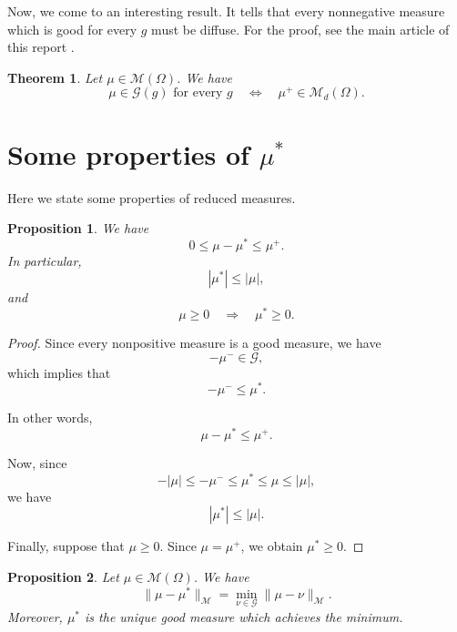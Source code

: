 \documentclass[a4paper, 11pt]{report}
\newtheorem{thm}{Theorem}[chapter]
\newtheorem{prn}{Proposition}[chapter]
\theoremstyle{definition}\newtheorem*{rmk}{Remark}
\begin{document}
Now, we come to an interesting result. It tells that every nonnegative measure which is good for every $g$ must be diffuse. For the proof, see the main article of this report \cite[Section 6]{BMP}.

\begin{thm}
Let $\mu \in \mathcal{M}(\Omega)$. We have
\[
\mu \in \mathcal{G}(g) \text{ for every } g \quad \Leftrightarrow \quad \mu^+ \in \mathcal{M}_d(\Omega).
\]
\end{thm}

\section{\texorpdfstring{Some properties of $\mu^*$}{Some properties of mu*}}
\mbox{}

Here we state some properties of reduced measures.

\begin{prn}
We have
\[
0 \le \mu - \mu ^* \le \mu^+.
\]
In particular,
\begin{equation}\label{016}
|\mu ^*| \le |\mu|,
\end{equation}
and
\[
\mu \ge 0 \quad \Rightarrow \quad \mu ^* \ge 0.
\]
\end{prn}

\begin{proof}
\mbox{}

Since every nonpositive measure is a good measure, we have
\[
-\mu^- \in\mathcal{G},
\]
which implies that
\[
-\mu^- \leq \mu^*.
\]

In other words,
\[
\mu - \mu^* \leq \mu^+.
\]

Now, since
\[
-|\mu| \leq -\mu^- \leq \mu^* \leq \mu \leq |\mu|,
\]
we have
\[
|\mu^*|\leq |\mu|.
\]

Finally, suppose that $\mu \geq 0$. Since $\mu = \mu^+$, we obtain $\mu^* \ge 0$.
\end{proof}

\begin{prn}
Let $\mu \in \mathcal{M}(\Omega)$. We have
\begin{equation}\label{prn50}
\| \mu - \mu^*\|_{\mathcal{M}} = \min_{\nu \in \mathcal{G}} \| \mu - \nu \|_{\mathcal{M}}.
\end{equation}
Moreover, $\mu^*$ is the unique good measure which achieves the minimum.
\end{prn}
\end{document}
